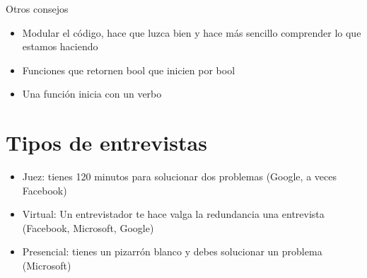 Otros consejos 
\begin{itemize}
    \item {Modular el código, hace que luzca bien y hace más sencillo comprender lo que estamos haciendo}
    \item {Funciones que retornen bool que inicien por bool}
    \item {Una función inicia con un verbo}
\end{itemize}

\section{Tipos de entrevistas}

\begin{itemize}
    \item {Juez: tienes 120 minutos para solucionar dos problemas (Google, a veces Facebook)}
    \item {Virtual: Un entrevistador te hace valga la redundancia una entrevista (Facebook, Microsoft, Google)}
    \item {Presencial: tienes un pizarrón blanco y debes solucionar un problema (Microsoft)}
\end{itemize}